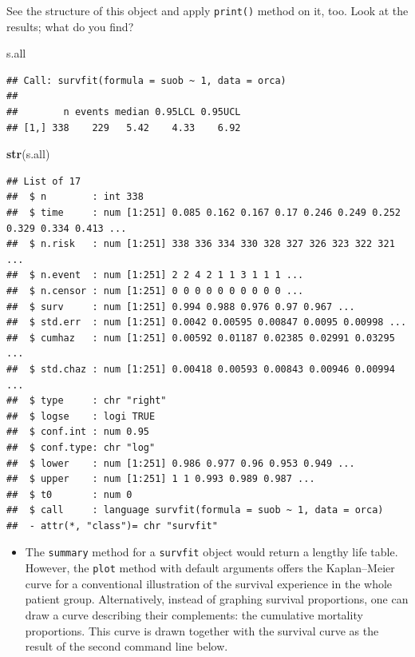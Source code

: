 \documentclass[
]{book}
\newenvironment{Shaded}{\begin{snugshade}}{\end{snugshade}}
\newcommand{\FunctionTok}[1]{\textcolor[rgb]{0.13,0.29,0.53}{\textbf{#1}}}
\newcommand{\NormalTok}[1]{#1}
\providecommand{\tightlist}{%
  \setlength{\itemsep}{0pt}\setlength{\parskip}{0pt}}
\begin{document}
See the structure of this object and apply \texttt{print()} method on it, too.
Look at the results; what do you find?

\begin{Shaded}
\begin{Highlighting}[]
\NormalTok{s.all}
\end{Highlighting}
\end{Shaded}

\begin{verbatim}
## Call: survfit(formula = suob ~ 1, data = orca)
## 
##        n events median 0.95LCL 0.95UCL
## [1,] 338    229   5.42    4.33    6.92
\end{verbatim}

\begin{Shaded}
\begin{Highlighting}[]
\FunctionTok{str}\NormalTok{(s.all)}
\end{Highlighting}
\end{Shaded}

\begin{verbatim}
## List of 17
##  $ n        : int 338
##  $ time     : num [1:251] 0.085 0.162 0.167 0.17 0.246 0.249 0.252 0.329 0.334 0.413 ...
##  $ n.risk   : num [1:251] 338 336 334 330 328 327 326 323 322 321 ...
##  $ n.event  : num [1:251] 2 2 4 2 1 1 3 1 1 1 ...
##  $ n.censor : num [1:251] 0 0 0 0 0 0 0 0 0 0 ...
##  $ surv     : num [1:251] 0.994 0.988 0.976 0.97 0.967 ...
##  $ std.err  : num [1:251] 0.0042 0.00595 0.00847 0.0095 0.00998 ...
##  $ cumhaz   : num [1:251] 0.00592 0.01187 0.02385 0.02991 0.03295 ...
##  $ std.chaz : num [1:251] 0.00418 0.00593 0.00843 0.00946 0.00994 ...
##  $ type     : chr "right"
##  $ logse    : logi TRUE
##  $ conf.int : num 0.95
##  $ conf.type: chr "log"
##  $ lower    : num [1:251] 0.986 0.977 0.96 0.953 0.949 ...
##  $ upper    : num [1:251] 1 1 0.993 0.989 0.987 ...
##  $ t0       : num 0
##  $ call     : language survfit(formula = suob ~ 1, data = orca)
##  - attr(*, "class")= chr "survfit"
\end{verbatim}

\begin{itemize}
\tightlist
\item
  The \texttt{summary} method for
  a \texttt{survfit} object would return a lengthy life table.
  However, the \texttt{plot} method with default
  arguments offers the Kaplan--Meier curve
  for a conventional illustration of the survival experience in the whole patient group.
  Alternatively, instead of graphing survival proportions,
  one can draw a curve describing their complements: the cumulative mortality proportions. This curve is drawn together with the survival curve as the
  result of the second command line below.
\end{itemize}
\end{document}
